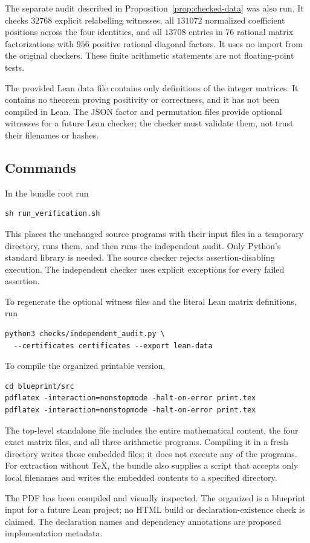 The separate audit described in Proposition~\ref{prop:checked-data} was also run.  It checks
$32768$ explicit relabelling witnesses, all $131072$ normalized coefficient positions across
the four identities, and all $13708$ entries in $76$ rational matrix factorizations with
$956$ positive rational diagonal factors.  It uses no import from the original checkers.
These finite arithmetic statements are not floating-point tests.

The provided Lean data file contains only definitions of the integer matrices.  It contains
no theorem proving positivity or correctness, and it has not been compiled in Lean.  The
JSON factor and permutation files provide optional witnesses for a future Lean checker;
the checker must validate them, not trust their filenames or hashes.

\subsection{Commands}
In the bundle root run
\begin{verbatim}
sh run_verification.sh
\end{verbatim}
This places the unchanged source programs with their input files in a temporary directory,
runs them, and then runs the independent audit.  Only Python's standard library is needed.
The source checker rejects assertion-disabling execution.  The independent checker uses
explicit exceptions for every failed assertion.

To regenerate the optional witness files and the literal Lean matrix definitions, run
\begin{verbatim}
python3 checks/independent_audit.py \
  --certificates certificates --export lean-data
\end{verbatim}
To compile the organized printable version,
\begin{verbatim}
cd blueprint/src
pdflatex -interaction=nonstopmode -halt-on-error print.tex
pdflatex -interaction=nonstopmode -halt-on-error print.tex
\end{verbatim}
The top-level standalone file  includes the entire mathematical
content, the four exact matrix files, and all three arithmetic programs.  Compiling it in a
fresh directory writes those embedded files; it does not execute any of the programs.
For extraction without TeX, the bundle also supplies a script that accepts only local
filenames and writes the embedded contents to a specified directory.

The PDF has been compiled and visually inspected.  The organized  is a
blueprint input for a future Lean project; no HTML build or declaration-existence check is
claimed.  The declaration names and dependency annotations are proposed implementation
metadata.

